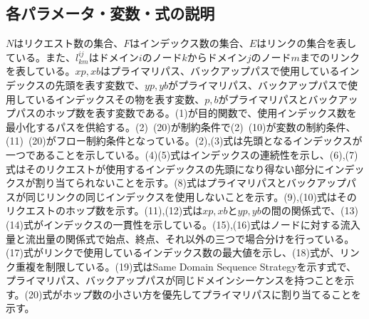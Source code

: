 \documentclass[a4j,twocolumn,fleqn]{jarticle}
\begin{document}
\subsection{各パラメータ・変数・式の説明}
$N$はリクエスト数の集合、$F$はインデックス数の集合、$E$はリンクの集合を表している。また、$l^{ij}_{km}$はドメイン$i$のノード$k$からドメイン$j$のノード$m$までのリンクを表している。$xp,xb$はプライマリパス、バックアップパスで使用しているインデックスの先頭を表す変数で、$yp,yb$がプライマリパス、バックアップパスで使用しているインデックスその物を表す変数、$p,b$がプライマリパスとバックアップパスのホップ数を表す変数である。(1)が目的関数で、使用インデックス数を最小化するパスを供給する。(2)~(20)が制約条件で(2)~(10)が変数の制約条件、(11)~(20)がフロー制約条件となっている。(2),(3)式は先頭となるインデックスが一つであることを示している。(4)(5)式はインデックスの連続性を示し、(6),(7)式はそのリクエストが使用するインデックスの先頭になり得ない部分にインデックスが割り当てられないことを示す。(8)式はプライマリパスとバックアップパスが同じリンクの同じインデックスを使用しないことを示す。(9),(10)式はそのリクエストのホップ数を示す。(11),(12)式は$xp,xb$と$yp,yb$の間の関係式で、(13)(14)式がインデックスの一貫性を示している。(15),(16)式はノードに対する流入量と流出量の関係式で始点、終点、それ以外の三つで場合分けを行っている。(17)式がリンクで使用しているインデックス数の最大値を示し、(18)式が、リンク重複を制限している。(19)式はSame Domain Sequence Strategyを示す式で、プライマリパス、バックアップパスが同じドメインシーケンスを持つことを示す。(20)式がホップ数の小さい方を優先してプライマリパスに割り当てることを示す。
\end{document}
